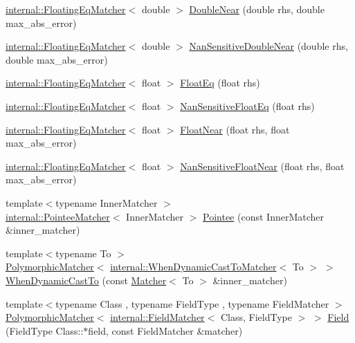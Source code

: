 \begin{DoxyCompactItemize}
\item 
\hyperlink{classtesting_1_1internal_1_1FloatingEqMatcher}{internal\+::\+Floating\+Eq\+Matcher}$<$ double $>$ \hyperlink{namespacetesting_aaee08ecb6815ef8398bbcb4e56d56d44}{Double\+Near} (double rhs, double max\+\_\+abs\+\_\+error)
\item 
\hyperlink{classtesting_1_1internal_1_1FloatingEqMatcher}{internal\+::\+Floating\+Eq\+Matcher}$<$ double $>$ \hyperlink{namespacetesting_a3caa8177ef48150d0dde3a54b0961f7f}{Nan\+Sensitive\+Double\+Near} (double rhs, double max\+\_\+abs\+\_\+error)
\item 
\hyperlink{classtesting_1_1internal_1_1FloatingEqMatcher}{internal\+::\+Floating\+Eq\+Matcher}$<$ float $>$ \hyperlink{namespacetesting_ac75507edb7998957b48fb17a9b8a020b}{Float\+Eq} (float rhs)
\item 
\hyperlink{classtesting_1_1internal_1_1FloatingEqMatcher}{internal\+::\+Floating\+Eq\+Matcher}$<$ float $>$ \hyperlink{namespacetesting_ab3653439a654b85bdccff46d1436670d}{Nan\+Sensitive\+Float\+Eq} (float rhs)
\item 
\hyperlink{classtesting_1_1internal_1_1FloatingEqMatcher}{internal\+::\+Floating\+Eq\+Matcher}$<$ float $>$ \hyperlink{namespacetesting_a933a78452dd1770669bed758f35ff250}{Float\+Near} (float rhs, float max\+\_\+abs\+\_\+error)
\item 
\hyperlink{classtesting_1_1internal_1_1FloatingEqMatcher}{internal\+::\+Floating\+Eq\+Matcher}$<$ float $>$ \hyperlink{namespacetesting_a347ebf0075ca9470e71e8ac468c9818f}{Nan\+Sensitive\+Float\+Near} (float rhs, float max\+\_\+abs\+\_\+error)
\item 
{\footnotesize template$<$typename Inner\+Matcher $>$ }\\\hyperlink{classtesting_1_1internal_1_1PointeeMatcher}{internal\+::\+Pointee\+Matcher}$<$ Inner\+Matcher $>$ \hyperlink{namespacetesting_a5122ca3533f3a00f67e146dd81f3b68c}{Pointee} (const Inner\+Matcher \&inner\+\_\+matcher)
\item 
{\footnotesize template$<$typename To $>$ }\\\hyperlink{classtesting_1_1PolymorphicMatcher}{Polymorphic\+Matcher}$<$ \hyperlink{classtesting_1_1internal_1_1WhenDynamicCastToMatcher}{internal\+::\+When\+Dynamic\+Cast\+To\+Matcher}$<$ To $>$ $>$ \hyperlink{namespacetesting_aabfc320cc132d0a1da2a255b45a17b7a}{When\+Dynamic\+Cast\+To} (const \hyperlink{classtesting_1_1Matcher}{Matcher}$<$ To $>$ \&inner\+\_\+matcher)
\item 
{\footnotesize template$<$typename Class , typename Field\+Type , typename Field\+Matcher $>$ }\\\hyperlink{classtesting_1_1PolymorphicMatcher}{Polymorphic\+Matcher}$<$ \hyperlink{classtesting_1_1internal_1_1FieldMatcher}{internal\+::\+Field\+Matcher}$<$ Class, Field\+Type $>$ $>$ \hyperlink{namespacetesting_a4df3849391696aa93ac3a7703a717c2a}{Field} (Field\+Type Class\+::$\ast$field, const Field\+Matcher \&matcher)

\end{DoxyCompactItemize}
